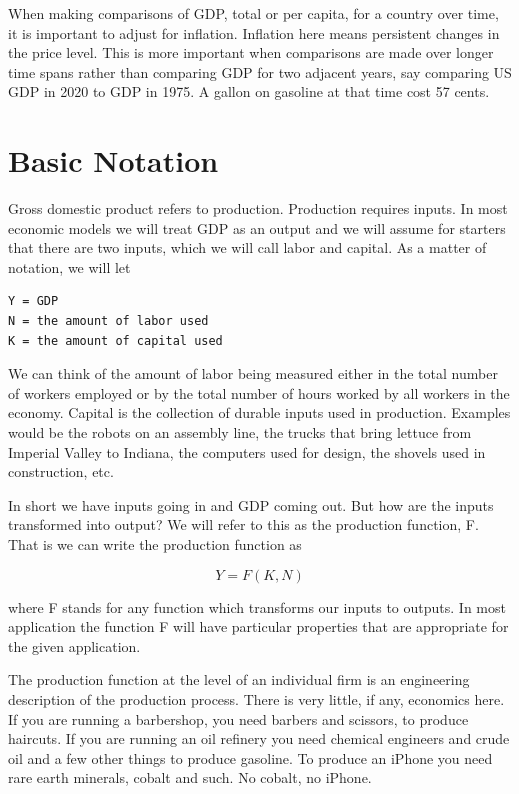 \documentclass[
]{book}
\begin{document}
When making comparisons of GDP, total or per capita, for a country over time, it is important to adjust for inflation. Inflation here means persistent changes in the price level. This is more important when comparisons are made over longer time spans rather than comparing GDP for two adjacent years, say comparing US GDP in 2020 to GDP in 1975. A gallon on gasoline at that time cost 57 cents.

\hypertarget{basic-notation}{%
\section{Basic Notation}\label{basic-notation}}

Gross domestic product refers to production. Production requires inputs. In most economic models we will treat GDP as an output and we will assume for starters that there are two inputs, which we will call labor and capital. As a matter of notation, we will let

\begin{verbatim}
Y = GDP
N = the amount of labor used
K = the amount of capital used
\end{verbatim}

We can think of the amount of labor being measured either in the total number of workers employed or by the total number of hours worked by all workers in the economy. Capital is the collection of durable inputs used in production. Examples would be the robots on an assembly line, the trucks that bring lettuce from Imperial Valley to Indiana, the computers used for design, the shovels used in construction, etc.

In short we have inputs going in and GDP coming out. But how are the inputs transformed into output? We will refer to this as the production function, F. That is we can write the production function as

\[Y = F(K,N)\]

where F stands for any function which transforms our inputs to outputs. In most application the function F will have particular properties that are appropriate for the given application.

The production function at the level of an individual firm is an engineering description of the production process. There is very little, if any, economics here. If you are running a barbershop, you need barbers and scissors, to produce haircuts. If you are running an oil refinery you need chemical engineers and crude oil and a few other things to produce gasoline. To produce an iPhone you need rare earth minerals, cobalt and such. No cobalt, no iPhone.
\end{document}
